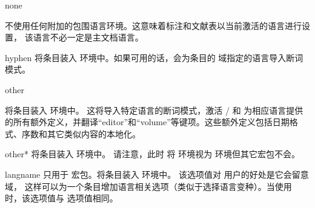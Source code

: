 \begin{optionlist}
\begin{valuelist}

\item[none]


不使用任何附加的包围语言环境。这意味着标注和文献表以当前激活的语言进行设置，
该语言不必一定是主文档语言。


\item[hyphen]
将条目装入   环境中。如果可用的话，会为条目的  域指定的语言导入断词模式。

\item[other]

将条目装入  环境中。
这将导入特定语言的断词模式，激活 / 和 \biblatex 为相应语言提供的所有额外定义，并翻译“editor”和“volume”等键项。这些额外定义包括日期格式、序数和其它类似内容的本地化。

\item[other*]
将条目装入  环境中。
请注意，此时 \biblatex 将  环境视为  环境但其它宏包不会。

\item[langname]
只用于  宏包。将条目装入  环境中。
该选项值对  用户的好处是它会留意  域，
这样可以为一个条目增加语言相关选项（类似于选择语言变种）。当使用  时，该选项值与  选项值相同。


\end{valuelist}
\end{optionlist}
